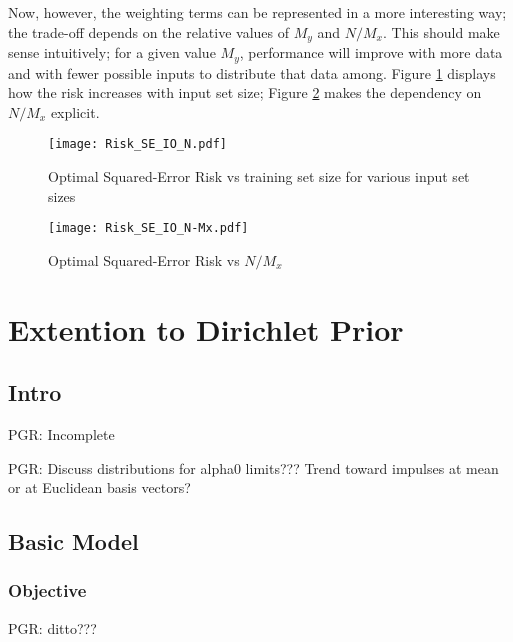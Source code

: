 \documentclass[12pt]{report}
\begin{document}
Now, however, the weighting terms can be represented in a more interesting way; the trade-off depends on the relative values of $M_y$ and $N/M_x$. This should make sense intuitively; for a given value $M_y$, performance will improve with more data and with fewer possible inputs to distribute that data among. Figure \ref{fig:Risk_SE_IO_N} displays how the risk increases with input set size; Figure \ref{fig:Risk_SE_IO_N-Mx} makes the dependency on $N/M_x$ explicit. 



\begin{figure}
\centering
\texttt{[image: Risk\_SE\_IO\_N.pdf]}
\caption{Optimal Squared-Error Risk vs training set size for various input set sizes}
\label{fig:Risk_SE_IO_N}
\end{figure}

\begin{figure}
\centering
\texttt{[image: Risk\_SE\_IO\_N-Mx.pdf]}
\caption{Optimal Squared-Error Risk vs $N/M_x$}
\label{fig:Risk_SE_IO_N-Mx}
\end{figure}














\chapter{Extention to Dirichlet Prior}


\section{Intro}

PGR: Incomplete

PGR: Discuss distributions for alpha0 limits??? Trend toward impulses at mean or at Euclidean basis vectors?



\section{Basic Model}


\subsection{Objective}

PGR: ditto???
\end{document}
